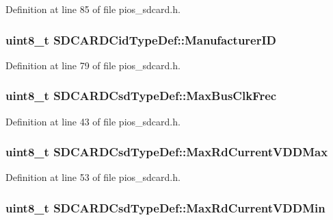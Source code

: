 \-Definition at line 85 of file pios\-\_\-sdcard.\-h.

\hypertarget{group___p_i_o_s___s_d_c_a_r_d_ga083dff8fb19fcec5bf79ab18c105b6c3}{
\subsubsection[{\-Manufacturer\-I\-D}]{\setlength{\rightskip}{0pt plus 5cm}uint8\-\_\-t {\bf \-S\-D\-C\-A\-R\-D\-Cid\-Type\-Def\-::\-Manufacturer\-I\-D}}}\label{group___p_i_o_s___s_d_c_a_r_d_ga083dff8fb19fcec5bf79ab18c105b6c3}


\-Definition at line 79 of file pios\-\_\-sdcard.\-h.

\hypertarget{group___p_i_o_s___s_d_c_a_r_d_ga9413a0371dfa0c4bf305c922b10392f1}{
\subsubsection[{\-Max\-Bus\-Clk\-Frec}]{\setlength{\rightskip}{0pt plus 5cm}uint8\-\_\-t {\bf \-S\-D\-C\-A\-R\-D\-Csd\-Type\-Def\-::\-Max\-Bus\-Clk\-Frec}}}\label{group___p_i_o_s___s_d_c_a_r_d_ga9413a0371dfa0c4bf305c922b10392f1}


\-Definition at line 43 of file pios\-\_\-sdcard.\-h.

\hypertarget{group___p_i_o_s___s_d_c_a_r_d_ga3ba17f2a67a38414d67aaad8d7cc99be}{
\subsubsection[{\-Max\-Rd\-Current\-V\-D\-D\-Max}]{\setlength{\rightskip}{0pt plus 5cm}uint8\-\_\-t {\bf \-S\-D\-C\-A\-R\-D\-Csd\-Type\-Def\-::\-Max\-Rd\-Current\-V\-D\-D\-Max}}}\label{group___p_i_o_s___s_d_c_a_r_d_ga3ba17f2a67a38414d67aaad8d7cc99be}


\-Definition at line 53 of file pios\-\_\-sdcard.\-h.

\hypertarget{group___p_i_o_s___s_d_c_a_r_d_ga44848558ce422fd005494fcb94656fa8}{
\subsubsection[{\-Max\-Rd\-Current\-V\-D\-D\-Min}]{\setlength{\rightskip}{0pt plus 5cm}uint8\-\_\-t {\bf \-S\-D\-C\-A\-R\-D\-Csd\-Type\-Def\-::\-Max\-Rd\-Current\-V\-D\-D\-Min}}}\label{group___p_i_o_s___s_d_c_a_r_d_ga44848558ce422fd005494fcb94656fa8}


